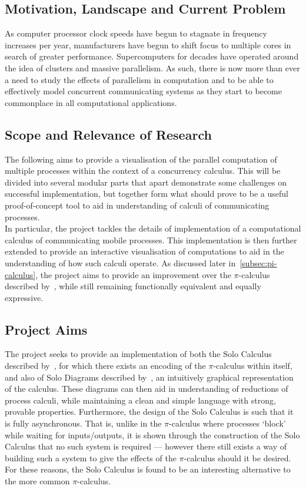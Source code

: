 \subsection{Motivation, Landscape and Current Problem}

    As computer processor clock speeds have begun to stagnate in frequency increases per year, manufacturers have begun to shift focus to multiple cores in search of greater performance.
    Supercomputers for decades have operated around the idea of clusters and massive parallelism.
    As such, there is now more than ever a need to study the effects of parallelism in computation and to be able to effectively model concurrent communicating systems as they start to become commonplace in all computational applications.


\subsection{Scope and Relevance of Research}

    The following aims to provide a visualisation of the parallel computation of multiple processes within the context of a concurrency calculus.
    This will be divided into several modular parts that apart demonstrate some challenges on successful implementation, but together form what should prove to be a useful proof-of-concept tool to aid in understanding of calculi of communicating processes.\\

    In particular, the project tackles the details of implementation of a computational calculus of communicating mobile processes.
    This implementation is then further extended to provide an interactive visualisation of computations to aid in the understanding of how such calculi operate.
    As discussed later in~\ref{subsec:pi-calculus}, the project aims to provide an improvement over the $\pi$-calculus described by~\cite{pi-calculus}, while still remaining functionally equivalent and equally expressive.


\subsection{Project Aims}

    The project seeks to provide an implementation of both the Solo Calculus described by~\cite{solo-calculus}, for which there exists an encoding of the $\pi$-calculus within itself, and also of Solo Diagrams described by~\cite{solo-diagrams}, an intuitively graphical representation of the calculus.
    These diagrams can then aid in understanding of reductions of process calculi, while maintaining a clean and simple language with strong, provable properties.
    Furthermore, the design of the Solo Calculus is such that it is fully asynchronous.
    That is, unlike in the $\pi$-calculus where processes ‘block’ while waiting for inputs/outputs, it is shown through the construction of the Solo Calculus that no such system is required --- however there still exists a way of building such a system to give the effects of the $\pi$-calculus should it be desired.
    For these reasons, the Solo Calculus is found to be an interesting alternative to the more common $\pi$-calculus.



